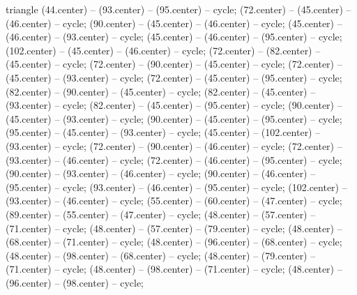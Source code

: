 {\begin{pgfonlayer}{triangle}
 (44.center) -- (93.center) -- (95.center) -- cycle; 
 (72.center) -- (45.center) -- (46.center) -- cycle; 
 (90.center) -- (45.center) -- (46.center) -- cycle; 
 (45.center) -- (46.center) -- (93.center) -- cycle; 
 (45.center) -- (46.center) -- (95.center) -- cycle; 
 (102.center) -- (45.center) -- (46.center) -- cycle; 
 (72.center) -- (82.center) -- (45.center) -- cycle; 
 (72.center) -- (90.center) -- (45.center) -- cycle; 
 (72.center) -- (45.center) -- (93.center) -- cycle; 
 (72.center) -- (45.center) -- (95.center) -- cycle; 
 (82.center) -- (90.center) -- (45.center) -- cycle; 
 (82.center) -- (45.center) -- (93.center) -- cycle; 
 (82.center) -- (45.center) -- (95.center) -- cycle; 
 (90.center) -- (45.center) -- (93.center) -- cycle; 
 (90.center) -- (45.center) -- (95.center) -- cycle; 
 (95.center) -- (45.center) -- (93.center) -- cycle; 
 (45.center) -- (102.center) -- (93.center) -- cycle; 
 (72.center) -- (90.center) -- (46.center) -- cycle; 
 (72.center) -- (93.center) -- (46.center) -- cycle; 
 (72.center) -- (46.center) -- (95.center) -- cycle; 
 (90.center) -- (93.center) -- (46.center) -- cycle; 
 (90.center) -- (46.center) -- (95.center) -- cycle; 
 (93.center) -- (46.center) -- (95.center) -- cycle; 
 (102.center) -- (93.center) -- (46.center) -- cycle; 
 (55.center) -- (60.center) -- (47.center) -- cycle; 
 (89.center) -- (55.center) -- (47.center) -- cycle; 
 (48.center) -- (57.center) -- (71.center) -- cycle; 
 (48.center) -- (57.center) -- (79.center) -- cycle; 
 (48.center) -- (68.center) -- (71.center) -- cycle; 
 (48.center) -- (96.center) -- (68.center) -- cycle; 
 (48.center) -- (98.center) -- (68.center) -- cycle; 
 (48.center) -- (79.center) -- (71.center) -- cycle; 
 (48.center) -- (98.center) -- (71.center) -- cycle; 
 (48.center) -- (96.center) -- (98.center) -- cycle; 

\end{pgfonlayer}}
